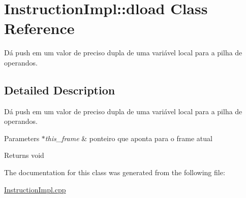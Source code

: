 \hypertarget{class_instruction_impl_1_1dload}{}\section{Instruction\+Impl\+:\+:dload Class Reference}
\label{class_instruction_impl_1_1dload}


Dá push em um valor de preciso dupla de uma variável local para a pilha de operandos.  




\subsection{Detailed Description}
Dá push em um valor de preciso dupla de uma variável local para a pilha de operandos. 


\begin{DoxyParams}{Parameters}
{\em $\ast$this\+\_\+frame} & ponteiro que aponta para o frame atual \\
\hline
\end{DoxyParams}
\begin{DoxyReturn}{Returns}
void 
\end{DoxyReturn}


The documentation for this class was generated from the following file\+:\begin{DoxyCompactItemize}
\item 
\hyperlink{_instruction_impl_8cpp}{Instruction\+Impl.\+cpp}\end{DoxyCompactItemize}
